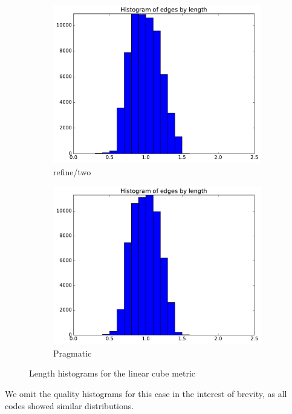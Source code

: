 \documentclass[3p,times,procedia,number]{elsarticle}
\begin{document}
\begin{figure}
\begin{subfigure}{.16\textwidth}
\includegraphics[width=\textwidth]{refine-two-cube-linear-length.pdf}
\caption{refine/two}
\end{subfigure}
\begin{subfigure}{.16\textwidth}
\centering
\includegraphics[width=\textwidth]{pragmatic-cube-linear-length.pdf}
\caption{Pragmatic}
\end{subfigure}
\caption{Length histograms for the linear cube metric}
\label{fig:cube-linear-lengths}
\end{figure}

We omit the quality histograms for this case in the interest
of brevity, as all codes showed similar distributions.
\end{document}
